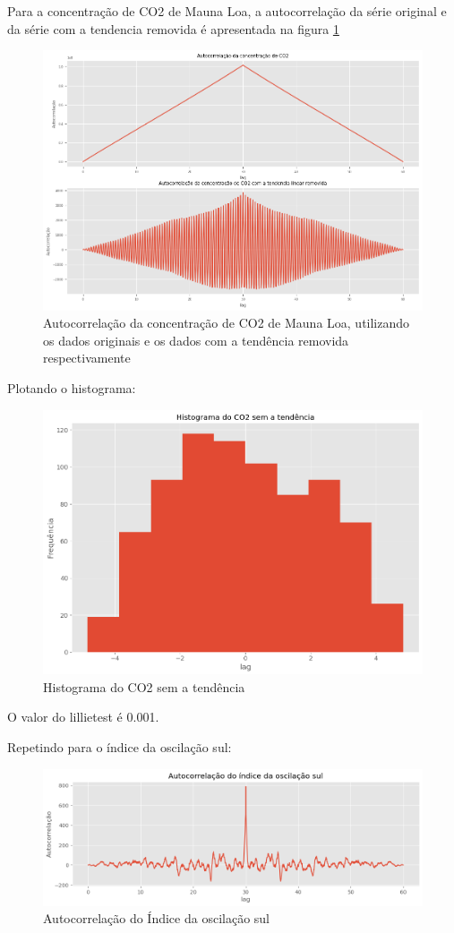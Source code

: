\documentclass[12pt,a4paper,portuguese]{article}
\begin{document}
Para a concentração de CO2 de Mauna Loa, a autocorrelação da série original e da série com a tendencia removida é apresentada na figura \ref{fig:lista3-6a}
\begin{figure}[H]
	\centering
	\includegraphics[width=1\linewidth]{lista3-6a}
	\caption{Autocorrelação da concentração de CO2 de Mauna Loa, utilizando os dados originais e os dados com a tendência removida respectivamente}
	\label{fig:lista3-6a}
\end{figure}
Plotando o histograma:
\begin{figure}[H]
	\centering
	\includegraphics[width=1\linewidth]{lista3-6d}
	\caption{Histograma do CO2 sem a tendência}
	\label{fig:lista3-6d}
\end{figure}
O valor do lillietest é 0.001.

Repetindo para o índice da oscilação sul:


\begin{figure}[H]
	\centering
	\includegraphics[width=1\linewidth]{lista3-7}
	\caption{Autocorrelação do Índice da oscilação sul}
	\label{fig:lista3-7}
\end{figure}
\end{document}
